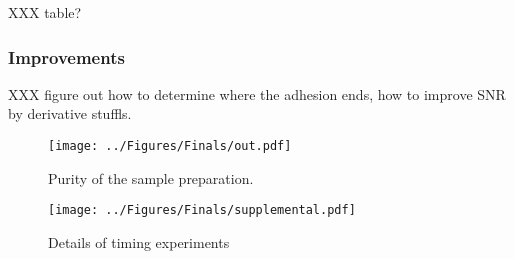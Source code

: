 \documentclass[%
  aip,12pt,tightenlines,
  amsthm,
 amsmath,amssymb
]{article}
\newcommand{\fLabel}[1]{\label{figure:#1}}
\newcommand{\pcaption}[1]{\caption{\noindent#1}}
\newcommand{\pEndF}[0]{ \\ }
\newcommand{\pStartF}[0]{ }
\begin{document}
XXX table?

\subsubsection{Improvements}

XXX figure out how to determine where the adhesion ends, how to improve SNR by derivative stuffls.


\begin{figure}
\centering
\texttt{[image: ../Figures/Finals/out.pdf]}%
\pcaption{\noindent\fLabel{Prep}\pStartF Purity of the sample preparation. \pEndF }
\end{figure}


\begin{figure}
\centering
\texttt{[image: ../Figures/Finals/supplemental.pdf]}%
\pcaption{\noindent\fLabel{Timing_Details}\pStartF Details of timing experiments\pEndF }
\end{figure}
\end{document}
